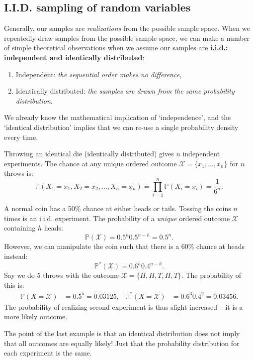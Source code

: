 \documentclass{article}
\begin{document}
\subsection{I.I.D. sampling of random variables}
Generally, our samples are \textit{realizations} from the possible sample space. When we repeatedly draw samples from the possible sample space, we can make a number of simple theoretical observations when we assume our samples are \textbf{i.i.d.: independent and identically distributed}:
\begin{enumerate}\itemsep0em
    \item Independent: \textit{the sequential order makes no difference},
    \item Identically distributed: \textit{the samples are drawn from the same probability distribution}.
\end{enumerate}
We already know the mathematical implication of `independence', and the `identical distribution' implies that we can re-use a single probability density every time. 
\begin{testexample}
    Throwing an identical die (identically distributed) gives $n$ independent experiments. The chance at any unique ordered outcome $\mathcal{X}=\{x_1,\dots,x_n\}$ for $n$ throws is:
    \begin{equation}
        \mathbb{P}(X_1=x_1,X_2=x_2,\dots,X_n=x_n) = \prod_{i=1}^n \mathbb{P}(X_i=x_i) = \frac{1}{6^n}.
    \end{equation}
\end{testexample}
\begin{testexample}
    A normal coin has a 50\% chance at either heads or tails. Tossing the coins $n$ times is an i.i.d. experiment. The probability of a \textit{unique} ordered outcome $\mathcal{X}$ containing $h$ heads:
    \begin{equation}
        \mathbb{P}(\mathcal{X}) = 0.5^h 0.5^{n-h} = 0.5^n.
    \end{equation}
    However, we can manipulate the coin such that there is a 60\% chance at heads instead:
    \begin{equation}
        \mathbb{P}^*(\mathcal{X}) = 0.6^h 0.4^{n-h}.
    \end{equation}
    Say we do 5 throws with the outcome $\mathcal{X}=\{H,H,T,H,T\}$. The probability of this is:
    \begin{align}
        \mathbb{P}(X=\mathcal{X}) & = 0.5^5=0.03125,&\mathbb{P}^*(X=\mathcal{X}) &= 0.6^3 0.4^2 =0.03456.
    \end{align}
    The probability of realizing second experiment is thus slight increased -- it is a more likely outcome.
\end{testexample}
{\flushleft The} point of the last example is that an identical distribution does not imply that all outcomes are equally likely! Just that the probability distribution for each experiment is the same.
\end{document}
